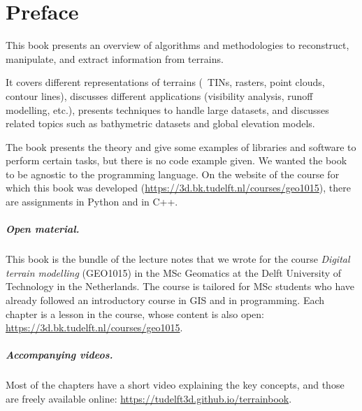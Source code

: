 


\chapter*{Preface}

This book presents an overview of algorithms and methodologies to reconstruct, manipulate, and extract information from terrains.

It covers different representations of terrains (\eg\ TINs, rasters, point clouds, contour lines), discusses different applications (visibility analysis, runoff modelling, etc.), presents techniques to handle large datasets, and discusses related topics such as bathymetric datasets and global elevation models.

The book presents the theory and give some examples of libraries and software to perform certain tasks, but there is no code example given.
We wanted the book to be agnostic to the programming language.
On the website of the course for which this book was developed (\url{https://3d.bk.tudelft.nl/courses/geo1015}), there are assignments in Python and in C++.



\paragraph*{Open material.}
This book is the bundle of the lecture notes that we wrote for the course \emph{Digital terrain modelling} (GEO1015) in the MSc Geomatics at the Delft University of Technology in the Netherlands.
The course is tailored for MSc students who have already followed an introductory course in GIS and in programming.
Each chapter is a lesson in the course, whose content is also open: \url{https://3d.bk.tudelft.nl/courses/geo1015}.


\paragraph*{Accompanying videos.}
Most of the chapters have a short video explaining the key concepts, and those are freely available online: \url{https://tudelft3d.github.io/terrainbook}.


